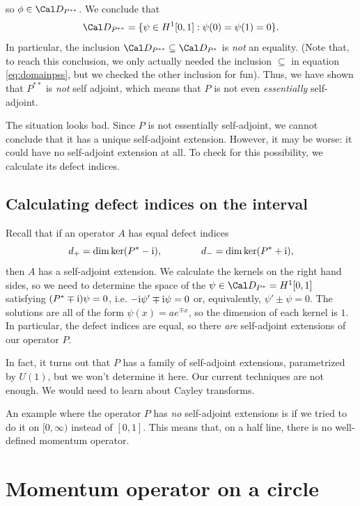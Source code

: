 so \(\phi\in\Cal D_{P^{**}}\).
We conclude that
\begin{equation}
  \label{eq:domainpss}
  \Cal D_{P^{**}} = \{\psi\in H^{1}[0,1] : \psi(0)=\psi(1)=0\}
.\end{equation}
In particular, the inclusion \(\Cal D_{P^{**}}\subseteq \Cal
D_{P^*}\) is \emph{not} an equality.
(Note that, to reach this conclusion, we only
actually needed the inclusion \(\subseteq\) in equation
\eqref{eq:domainpss}, but we checked the other inclusion for fun).
Thus, we have shown that \(P^{**}\) is \emph{not} self adjoint, which
means that \(P\) is not even \emph{essentially} self-adjoint.

The situation looks bad.
Since \(P\) is not essentially self-adjoint, we cannot conclude that
it has a unique self-adjoint extension. However, it may be worse: it
could have no self-adjoint extension at all. To check for this
possibility, we calculate its defect indices.

\subsection{Calculating defect indices on the interval}

Recall that if an operator \(A\) has equal defect indices
\begin{equation}
  d_+ = \dim \ker(P^{*}-\mathrm{i}),
  \qquad
  \qquad
  d_- = \dim \ker(P^{*}+\mathrm{i})
,\end{equation}
then \(A\) has a self-adjoint extension.
We calculate the kernels on the right hand sides, so we need to
determine the space of the \(\psi\in\Cal D_{P^*}=H^{1}[0,1]\) satisfying
\((P^*\mp\mathrm{i})\psi=0\), i.e. \(-\mathrm{i}\psi'\mp\mathrm{i}\psi=0\) or,
equivalently, \(\psi'\pm\psi=0\).
The solutions are all of the form \(\psi(x)=ae^{\mp x}\), so the
dimension of each kernel is \(1\). In particular, the defect indices
are equal, so there \emph{are} self-adjoint extensions of our operator \(P\).

In fact, it turns out that \(P\) has a family of self-adjoint
extensions, parametrized by \(U(1)\), but we won't determine it here.
Our current techniques are not enough.
We would need to learn about Cayley transforms.

An example where the operator \(P\) has \emph{no} self-adjoint
extensions is if we tried to do it on \([0,\infty)\) instead of
\([0,1]\). This means that, on a half line, there is no well-defined
momentum operator.

\section{Momentum operator on a circle}

